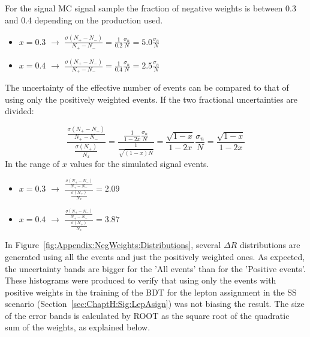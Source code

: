 For the signal \tHq \dileptau MC signal sample the fraction of negative weights is between 0.3 and 0.4 depending on the production used.
\begin{itemize}
	\item $x=0.3$	$\rightarrow$ $\frac{\sigma(N_{+} - N_{-})}{N_{+} - N_{-}}
	 = \frac{1}{0.2}\frac{\sigma_n}{N} = 5.0 \frac{\sigma_n}{N}$

	 \item $x=0.4$	$\rightarrow$ $\frac{\sigma(N_{+} - N_{-})}{N_{+} - N_{-}}
	 = \frac{1}{0.4}\frac{\sigma_n}{N} = 2.5 \frac{\sigma_n}{N}$
\end{itemize}

The uncertainty of the effective number of events can be compared to that of using only the 
positively weighted events. If the two fractional uncertainties are divided:

\begin{equation*}
	\frac{\frac{\sigma(N_{+} - N_{-})}{N_{+} - N_{-}}}{\frac{\sigma(N_+)}{N_x}}=
	\frac{\frac{1}{1-2x}\frac{\sigma_n}{N}}{\frac{1}{\sqrt{(1-x)N}}} =
	\frac{\sqrt{1-x}}{1-2x} \frac{\sigma_n}{N} = \frac{\sqrt{1-x}}{1-2x}
\end{equation*}
In the range of $x$ values for the \dileptau simulated signal events. 

\begin{minipage}[t]{0.57\linewidth}
\begin{itemize}
	\item $x=0.3$	$\rightarrow$ 
	$\frac{\frac{\sigma(N_{+} - N_{-})}{N_{+} - N_{-}}}{\frac{\sigma(N_+)}{N_x}}= 2.09$
	 \item $x=0.4$	$\rightarrow$ 
	$\frac{\frac{\sigma(N_{+} - N_{-})}{N_{+} - N_{-}}}{\frac{\sigma(N_+)}{N_x}}= 3.87$
\end{itemize}
\end{minipage}
\hfill
{}



In Figure~\ref{fig:Appendix:NegWeights:Distributions}, several $\Delta R$ distributions are generated using all the events
and just the positively weighted ones. As expected, the uncertainty bands are bigger for the 'All events' than for the
'Positive events'.  These histograms were produced to verify that using only the events with positive weights in
the training of the BDT for the lepton assignment in the SS scenario (Section~\ref{sec:ChaptH:Sig:LepAsign}) was not 
biasing the result. The size of the error bands is calculated by ROOT as the square root of the quadratic sum of the 
weights, as explained below.


